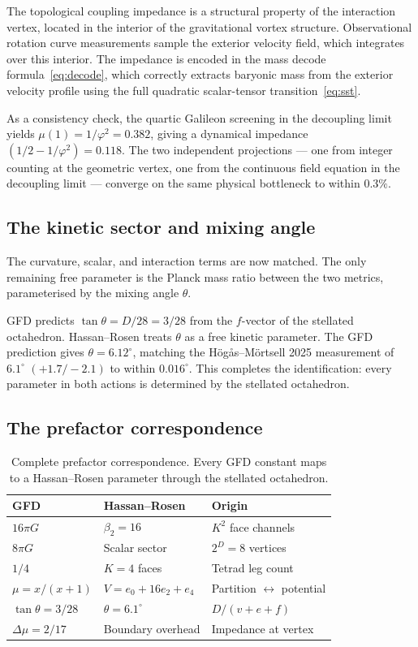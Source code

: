 \documentclass[twocolumn,showpacs,preprintnumbers,amsmath,amssymb,prd]{revtex4-2}
\begin{document}
The topological coupling impedance is a structural property of the interaction vertex, located in the interior of the gravitational vortex structure. Observational rotation curve measurements sample the exterior velocity field, which integrates over this interior. The impedance is encoded in the mass decode formula~\eqref{eq:decode}, which correctly extracts baryonic mass from the exterior velocity profile using the full quadratic scalar-tensor transition~\eqref{eq:sst}.

As a consistency check, the quartic Galileon screening in the decoupling limit yields $\mu(1) = 1/\varphi^2 = 0.382$, giving a dynamical impedance $(1/2 - 1/\varphi^2) = 0.118$. The two independent projections --- one from integer counting at the geometric vertex, one from the continuous field equation in the decoupling limit --- converge on the same physical bottleneck to within $0.3\%$.

\subsection{The kinetic sector and mixing angle}

The curvature, scalar, and interaction terms are now matched. The only remaining free parameter is the Planck mass ratio between the two metrics, parameterised by the mixing angle $\theta$.

GFD predicts $\tan\theta = D/28 = 3/28$ from the $f$-vector of the stellated octahedron. Hassan--Rosen treats $\theta$ as a free kinetic parameter. The GFD prediction gives $\theta = 6.12^\circ$, matching the H\"og\aa s--M\"ortsell 2025 measurement of $6.1^\circ$ $(+1.7/-2.1)$ to within $0.016^\circ$. This completes the identification: every parameter in both actions is determined by the stellated octahedron.

\subsection{The prefactor correspondence}

\begin{table}[h]
\centering
\begin{tabular}{lll}
\toprule
\textbf{GFD} & \textbf{Hassan--Rosen} & \textbf{Origin} \\
\midrule
$16\pi G$ & $\beta_2 = 16$ & $K^2$ face channels \\
$8\pi G$ & Scalar sector & $2^D = 8$ vertices \\
$1/4$ & $K = 4$ faces & Tetrad leg count \\
$\mu = x/(x+1)$ & $V = e_0 + 16e_2 + e_4$ & Partition $\leftrightarrow$ potential \\
$\tan\theta = 3/28$ & $\theta = 6.1^\circ$ & $D/(v+e+f)$ \\
$\Delta\mu = 2/17$ & Boundary overhead & Impedance at vertex \\
\bottomrule
\end{tabular}
\caption{Complete prefactor correspondence. Every GFD constant maps to a Hassan--Rosen parameter through the stellated octahedron.}
\label{tab:correspondence}
\end{table}
\end{document}

